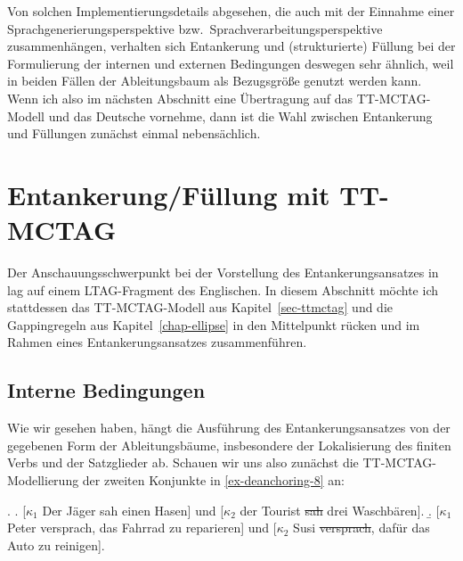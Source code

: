 Von solchen Implementierungsdetails abgesehen, die auch mit der Einnahme einer Sprachgenerierungsperspektive bzw.\ Sprachverarbeitungsperspektive zusammenhängen, verhalten sich Entankerung und (strukturierte) Füllung bei der Formulierung der internen und externen Bedingungen deswegen sehr ähnlich, weil in beiden Fällen der Ableitungsbaum als Bezugsgrö\ss e genutzt werden kann. Wenn ich also im nächsten Abschnitt eine Übertragung auf das TT-MCTAG-Modell und das Deutsche vornehme, dann ist die Wahl zwischen Entankerung und Füllungen zunächst einmal nebensächlich.     



\section{Entankerung/Füllung mit TT-MCTAG}\label{sec-deanchoring-ttmctag}

Der Anschauungsschwerpunkt bei der Vorstellung des Entankerungsansatzes in \cite{Lichte:Kallmeyer:10} lag auf einem LTAG-Fragment des Englischen. In diesem Abschnitt möchte ich stattdessen das TT-MCTAG-Modell aus Kapitel~\ref{sec-ttmctag} und die Gappingregeln aus Kapitel~\ref{chap-ellipse} in den Mittelpunkt rücken und im Rahmen eines Entankerungsansatzes zusammenführen. 


\subsection{Interne Bedingungen}

Wie wir gesehen haben, hängt die Ausführung des Entankerungsansatzes von der gegebenen Form der Ableitungsbäume, insbesondere der Lokalisierung des finiten Verbs und der Satzglieder ab. Schauen wir uns also zunächst die TT-MCTAG-Modellierung der zweiten Konjunkte in \ref{ex-deanchoring-8} an:

\ex. \label{ex-deanchoring-8}
\a. \label{ex-deanchoring-8-a} [$\kappa_1$ Der Jäger sah einen Hasen] und [$\kappa_2$ der Tourist \sout{sah} drei Waschbären].
\b. \label{ex-deanchoring-8-b} [$\kappa_1$ Peter versprach, das Fahrrad zu reparieren] und [$\kappa_2$ Susi \sout{ver\-sprach}, dafür das Auto zu reinigen].

